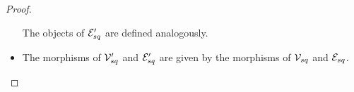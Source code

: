 \begin{proof}
\begin{itemize}
      The objects of $\mathcal{E}_{sq}'$ are defined analogously.
            
      \item The morphisms of $\mathcal{V}_{sq}'$ and $\mathcal{E}_{sq}'$ are given by the morphisms of $\mathcal{V}_{sq}$ and $\mathcal{E}_{sq}$.
      
     

      
    \end{itemize}
\end{proof}


